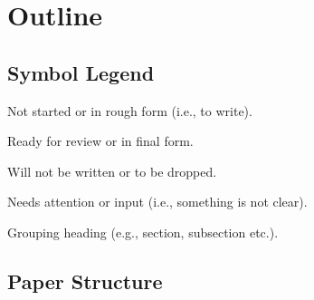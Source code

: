 \small

\section{Outline}

\subsection{Symbol Legend}

\begin{paragraphs}
    \item Not started or in rough form (i.e., to write).
    \item[\done] Ready for review or in final form.
    \item[\drop] Will not be written or to be dropped.
    \item[\look] Needs attention or input (i.e., something is not clear).
    \item[\head] Grouping heading (e.g., section, subsection etc.).
\end{paragraphs}

\subsection{Paper Structure}

